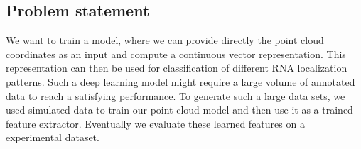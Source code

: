 \subsection{Problem statement}
\label{subsec:problem_statement}

We want to train a model, where we can provide directly the point cloud coordinates as an input and compute a continuous vector representation.
This representation can then be used for classification of different \ac{RNA} localization patterns.
Such a deep learning model might require a large volume of annotated data to reach a satisfying performance.
To generate such a large data sets, we used simulated data to train our point cloud model and then use it as a trained feature extractor.
Eventually we evaluate these learned features on a experimental dataset.


